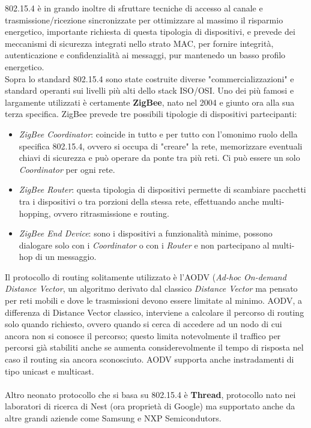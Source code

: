 802.15.4 è in grando inoltre di sfruttare tecniche di accesso al canale e trasmissione/ricezione sincronizzate per ottimizzare al massimo il risparmio energetico, importante richiesta di questa tipologia di dispositivi, e prevede dei meccanismi di sicurezza integrati nello strato MAC, per fornire integrità, autenticazione e confidenzialità ai messaggi, pur mantenedo un basso profilo energetico.
\vspace{1.0cm}
\\Sopra lo standard 802.15.4 sono state costruite diverse "commercializzazioni" e standard operanti sui livelli più alti dello stack ISO/OSI. Uno dei più famosi e largamente utilizzati è certamente \textbf{ZigBee}, nato nel 2004 e giunto ora alla sua terza specifica. ZigBee prevede tre possibili tipologie di dispositivi partecipanti:
\begin{itemize}
\item \textit{ZigBee Coordinator}: coincide in tutto e per tutto con l'omonimo ruolo della specifica 802.15.4, ovvero si occupa di "creare" la rete, memorizzare eventuali chiavi di sicurezza e può operare da ponte tra più reti. Ci può essere un solo \textit{Coordinator} per ogni rete.
\item \textit{ZigBee Router}: questa tipologia di dispositivi permette di scambiare pacchetti tra i dispositivi o tra porzioni della stessa rete, effettuando anche multi-hopping, ovvero ritrasmissione e routing.
\item \textit{ZigBee End Device}: sono i dispositivi a funzionalità minime, possono dialogare solo con i \textit{Coordinator} o con i \textit{Router} e non partecipano al multi-hop di un messaggio.
\end{itemize}
Il protocollo di routing solitamente utilizzato è l'AODV (\textit{Ad-hoc On-demand Distance Vector}, un algoritmo derivato dal classico \textit{Distance Vector} ma pensato per reti mobili e dove le trasmissioni devono essere limitate al minimo. AODV, a differenza di Distance Vector classico, interviene a calcolare il percorso di routing solo quando richiesto, ovvero quando si cerca di accedere ad un nodo di cui ancora non si conosce il percorso; questo limita notevolmente il traffico per percorsi già stabiliti anche se aumenta considerevolmente il tempo di risposta nel caso il routing sia ancora sconosciuto. AODV supporta anche instradamenti di tipo unicast e multicast.
\\\\Altro neonato protocollo che si basa su 802.15.4 è \textbf{Thread}, protocollo nato nei laboratori di ricerca di Nest (ora proprietà di Google) ma supportato anche da altre grandi aziende come Samsung e NXP Semicondutors.

